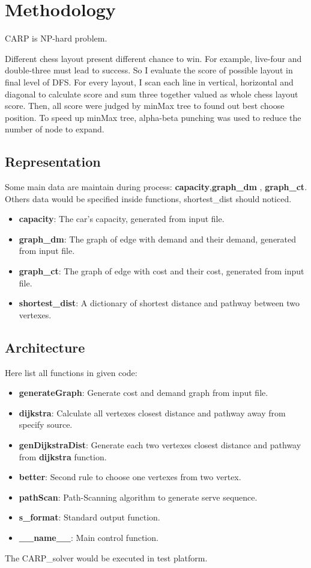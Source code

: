 \documentclass[conference,compsoc]{IEEEtran}
\begin{document}
\section{Methodology}
CARP is NP-hard problem.

Different chess layout present different chance to win. For example, live-four
and double-three must lead to success. So I evaluate the score of possible
layout in final level of DFS. For every layout, I scan each line in vertical,
horizontal and diagonal to calculate score and sum three together valued as
whole chess layout score. Then, all score were judged by minMax tree to found
out best choose position. To speed up minMax tree, alpha-beta punching was used
to reduce the number of node to expand.

\subsection{Representation}
Some main data are maintain during process: \textbf{capacity},\textbf{graph\_dm}
, \textbf{graph\_ct}.
Others data would be specified inside functions, shortest\_dist should noticed.

\begin{itemize}
  \item \textbf{capacity}: The car's capacity, generated from input file.
  \item \textbf{graph\_dm}: The graph of edge with demand and their demand,
  generated from input file.
  \item \textbf{graph\_ct}: The graph of edge with cost and their cost,
  generated from input file.
  \item \textbf{shortest\_dist}: A dictionary of shortest distance and pathway
  between two vertexes. 
\end{itemize}


\subsection{Architecture}
Here list all functions in given code:
\begin{itemize}
    \item \textbf{generateGraph}: Generate cost and demand graph from input file.
    \item \textbf{dijkstra}: Calculate all vertexes closest distance and
    pathway away from specify source.
    \item \textbf{genDijkstraDist}: Generate each two vertexes closest distance
    and pathway from \textbf{dijkstra} function.
    \item \textbf{better}: Second rule to choose one vertexes from two vertex. 
    \item \textbf{pathScan}: Path-Scanning algorithm to generate serve sequence. 
    \item \textbf{s\_format}: Standard output function. 
    \item \textbf{\_\_name\_\_}: Main control function. 
\end{itemize}
The CARP\_solver would be executed in test platform.
\end{document}
